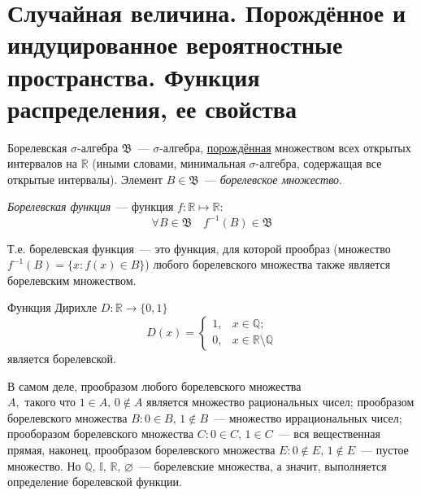 \section{Случайная величина. Порождённое и индуцированное вероятностные пространства. Функция распределения, ее свойства}

\begin{defn}
    \textit{$\text{Борелевская~} \sigma \text{-алгебра~} \mathfrak{B}$}~--- $\sigma \text{-алгебра}$, \hyperlink{generated_sigma}{порождённая} множеством всех открытых интервалов на $\mathbb{R}$ (иными словами, минимальная $\sigma$-алгебра, содержащая все открытые интервалы). 
    Элемент $B \in \mathfrak{B}$~--- \textit{борелевское множество}.
\end{defn}

\begin{defn}
    \textit{Борелевская функция}~--- функция $f\colon \mathbb{R} \mapsto \mathbb{R}$:
    \begin{equation*}
        \forall B \in \mathfrak{B} \quad f^{-1}(B) \in \mathfrak{B}
    \end{equation*}
    
    Т.е. борелевская функция~--- это функция, для которой прообраз (множество $f^{-1}(B) = \{x \colon f(x) \in B\}$) любого борелевского множества также является борелевским множеством.
\end{defn}

\begin{exmp}
    Функция Дирихле $D\colon \mathbb{R} \rightarrow \{0,1\}$
    \begin{equation*}
        D(x) =
        \begin{cases}
            1, & x \in \mathbb{Q}; \\
            0, & x \in \mathbb{R} \setminus \mathbb{Q}
        \end{cases}
    \end{equation*}
является борелевской. 

В самом деле, прообразом любого борелевского множества ${A, \text{ такого что } 1 \in A, \, 0 \notin A}$ является множество рациональных чисел; 
прообразом борелевского множества ${B \colon 0 \in B, \, 1 \notin B}$~--- множество иррациональных чисел; 
прооборазом борелевского множества ${C \colon 0 \in C, \, 1 \in C}$~--- вся вещественная прямая, 
наконец, прообразом борелевского множества ${E \colon 0 \notin E, \, 1 \notin E}$~--- пустое множество. 
Но $\mathbb{Q}, \, \mathbb{I}, \, \mathbb{R}, \, \varnothing $~--- борелевские множества, а значит, выполняется определение борелевской функции.
\end{exmp}


